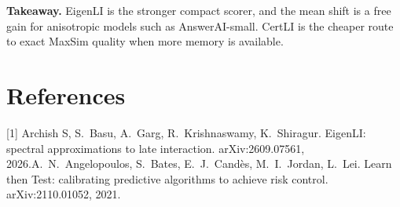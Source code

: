 \documentclass[10pt]{article}
\begin{document}
\textbf{Takeaway.} EigenLI is the stronger compact scorer, and the mean shift is a free gain for anisotropic models such as AnswerAI-small. CertLI is the cheaper route to exact MaxSim quality when more memory is available.

\section*{References}
{\small
[1] Archish S, S.\ Basu, A.\ Garg, R.\ Krishnaswamy, K.\ Shiragur. EigenLI: spectral approximations to late interaction. arXiv:2609.07561, 2026.\quad
[2] A.\ N.\ Angelopoulos, S.\ Bates, E.\ J.\ Cand\`es, M.\ I.\ Jordan, L.\ Lei. Learn then Test: calibrating predictive algorithms to achieve risk control. arXiv:2110.01052, 2021.}
\end{document}

